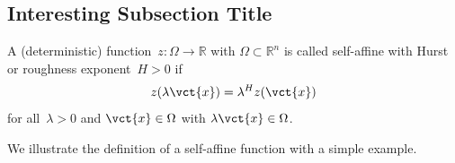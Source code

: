 \subsection{Interesting Subsection Title} \label{sec:sec11}
\lipsum[10]
\begin{defi} \label{def:selfaffinity}
A (deterministic) function~$z \colon \Omega \rightarrow \mathbb{R}$ with $\Omega \subset \mathbb{R}^n$ is called self-affine with Hurst or roughness exponent~$H>0$ if 
\begin{align}
z(\lambda \vct{x} ) = \lambda^H z(\vct{x} )
\end{align} 
for all~$\lambda > 0$ and $\vct{x} \in \Omega$ with $\lambda \vct{x} \in \Omega$.
\end{defi}
\begin{ex} \label{ex:fractal}
We illustrate the definition of a self-affine function with a simple example. 
\lipsum[7]
\end{ex}
